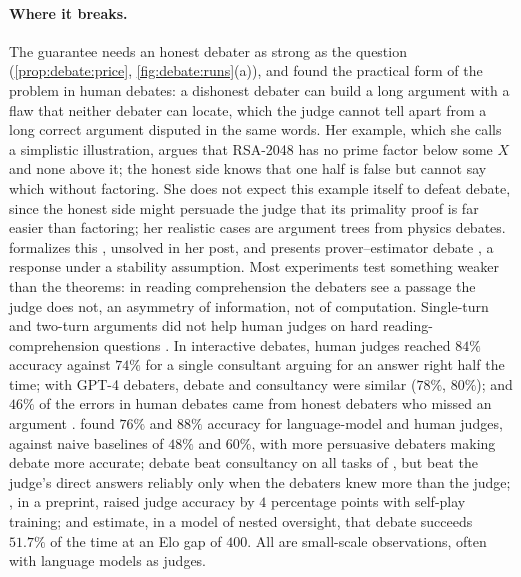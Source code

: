 \begin{refsection}
\paragraph{Where it breaks.} The guarantee needs an honest debater as strong as the question (\cref{prop:debate:price}, \cref{fig:debate:runs}(a)), and \textcite{Barnes2020} found the practical form of the problem in human debates: a dishonest debater can build a long argument with a flaw that neither debater can locate, which the judge cannot tell apart from a long correct argument disputed in the same words. Her example, which she calls a simplistic illustration, argues that RSA-2048 has no prime factor below some $X$ and none above it; the honest side knows that one half is false but cannot say which without factoring. She does not expect this example itself to defeat debate, since the honest side might persuade the judge that its primality proof is far easier than factoring; her realistic cases are argument trees from physics debates.  formalizes this , unsolved in her post, and presents prover--estimator debate \parencite{BrownCohenEtAl2026}, a response under a stability assumption. Most experiments test something weaker than the theorems: in reading comprehension the debaters see a passage the judge does not, an asymmetry of information, not of computation. Single-turn and two-turn arguments did not help human judges on hard reading-comprehension questions \parencite{ParrishEtAl2022a,ParrishEtAl2022b}. In interactive debates, human judges reached $84\%$ accuracy against $74\%$ for a single consultant arguing for an answer right half the time; with GPT-4 debaters, debate and consultancy were similar ($78\%$, $80\%$); and $46\%$ of the errors in human debates came from honest debaters who missed an argument \parencite{MichaelEtAl2023}. \Textcite{KhanEtAl2024} found $76\%$ and $88\%$ accuracy for language-model and human judges, against naive baselines of $48\%$ and $60\%$, with more persuasive debaters making debate more accurate; debate beat consultancy on all tasks of \textcite{KentonEtAl2024}, but beat the judge's direct answers reliably only when the debaters knew more than the judge; \textcite{ArnesenEtAl2024}, in a preprint, raised judge accuracy by $4$ percentage points with self-play training; and \textcite{EngelsEtAl2025} estimate, in a model of nested oversight, that debate succeeds $51.7\%$ of the time at an Elo gap of $400$. All are small-scale observations, often with language models as judges.


\end{refsection}
